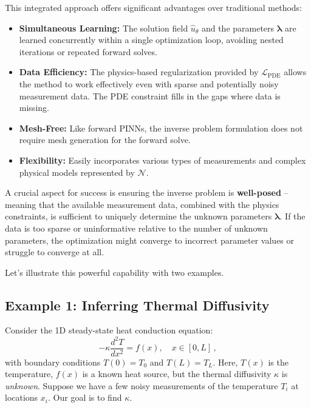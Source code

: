 This integrated approach offers significant advantages over traditional methods:
\begin{itemize}
    \item \textbf{Simultaneous Learning:} The solution field $\hat{u}_\theta$ and the parameters $\boldsymbol{\lambda}$ are learned concurrently within a single optimization loop, avoiding nested iterations or repeated forward solves.
    \item \textbf{Data Efficiency:} The physics-based regularization provided by $\mathcal{L}_{\text{PDE}}$ allows the method to work effectively even with sparse and potentially noisy measurement data. The PDE constraint fills in the gaps where data is missing.
    \item \textbf{Mesh-Free:} Like forward PINNs, the inverse problem formulation does not require mesh generation for the forward solve.
    \item \textbf{Flexibility:} Easily incorporates various types of measurements and complex physical models represented by $\mathcal{N}$.
\end{itemize}

A crucial aspect for success is ensuring the inverse problem is \textbf{well-posed} – meaning that the available measurement data, combined with the physics constraints, is sufficient to uniquely determine the unknown parameters $\boldsymbol{\lambda}$. If the data is too sparse or uninformative relative to the number of unknown parameters, the optimization might converge to incorrect parameter values or struggle to converge at all.

Let's illustrate this powerful capability with two examples.

\subsection{Example 1: Inferring Thermal Diffusivity}

Consider the 1D steady-state heat conduction equation:
%
\begin{equation*}
-\kappa \frac{d^2T}{dx^2} = f(x), \quad x \in [0, L]\,,
\end{equation*}
%
with boundary conditions $T(0) = T_0$ and $T(L) = T_L$. Here, $T(x)$ is the temperature, $f(x)$ is a known heat source, but the thermal diffusivity $\kappa$ is \textit{unknown}. Suppose we have a few noisy measurements of the temperature $T_i$ at locations $x_i$. Our goal is to find $\kappa$.


